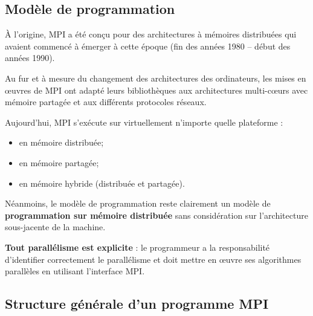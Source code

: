 \documentclass[11pt,a4paper]{article}
\begin{document}
\subsection{Mod\`ele de programmation}

\`A l'origine, MPI a été con\c{c}u pour des architectures \`a m\'emoires distribu\'ees qui avaient commenc\'e \`a \'emerger \`a
cette \'epoque (fin des ann\'ees 1980 -- début des ann\'ees 1990).

Au fur et \`a mesure du changement des architectures des ordinateurs, les mises en {\oe}uvres de MPI ont adapt\'e leurs
biblioth\`eques aux architectures multi-c{\oe}urs avec m\'emoire partag\'ee et aux diff\'erents protocoles r\'eseaux.

Aujourd'hui, MPI s'ex\'ecute sur virtuellement n'importe quelle plateforme :
\begin{itemize}
\item en m\'emoire distribu\'ee;
\item en m\'emoire partag\'ee;
\item en m\'emoire hybride (distribu\'ee et partag\'ee).
\end{itemize}

N\'eanmoins, le mod\`ele de programmation reste clairement un mod\`ele de \textbf{programmation sur m\'emoire distribu\'ee} sans 
consid\'eration sur l'architecture sous-jacente de la machine.

\textbf{Tout parall\'elisme est explicite} : le programmeur a la responsabilité d'identifier correctement le parall\'elisme
et doit mettre en {\oe}uvre ses algorithmes parall\`eles en utilisant l'interface MPI.

\subsection{Structure g\'en\'erale d'un programme MPI}
\end{document}
